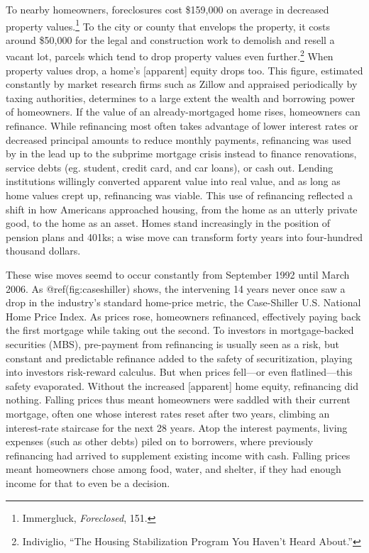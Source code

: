 \documentclass[
]{article}
\let\rmarkdownfootnote\footnote%
\def\footnote{\protect\rmarkdownfootnote}
\begin{document}
To nearby homeowners, foreclosures cost \$159,000 on average in
decreased property values.\footnote{Immergluck, \emph{Foreclosed}, 151.}
To the city or county that envelops the property, it costs around
\$50,000 for the legal and construction work to demolish and resell a
vacant lot, parcels which tend to drop property values even
further.\footnote{Indiviglio, ``The Housing Stabilization Program You
  Haven't Heard About.''} When property values drop, a home's
{[}apparent{]} equity drops too. This figure, estimated constantly by
market research firms such as Zillow and appraised periodically by
taxing authorities, determines to a large extent the wealth and
borrowing power of homeowners. If the value of an already-mortgaged home
rises, homeowners can refinance. While refinancing most often takes
advantage of lower interest rates or decreased principal amounts to
reduce monthly payments, refinancing was used by in the lead up to the
subprime mortgage crisis instead to finance renovations, service debts
(eg. student, credit card, and car loans), or cash out. Lending
institutions willingly converted apparent value into real value, and as
long as home values crept up, refinancing was viable. This use of
refinancing reflected a shift in how Americans approached housing, from
the home as an utterly private good, to the home as an asset. Homes
stand increasingly in the position of pension plans and 401ks; a wise
move can transform forty years into four-hundred thousand dollars.

These wise moves seemd to occur constantly from September 1992 until
March 2006. As @ref(fig:caseshiller) shows, the intervening 14 years
never once saw a drop in the industry's standard home-price metric, the
Case-Shiller U.S. National Home Price Index. As prices rose, homeowners
refinanced, effectively paying back the first mortgage while taking out
the second. To investors in mortgage-backed securities (MBS),
pre-payment from refinancing is usually seen as a risk, but constant and
predictable refinance added to the safety of securitization, playing
into investors risk-reward calculus. But when prices fell---or even
flatlined---this safety evaporated. Without the increased {[}apparent{]}
home equity, refinancing did nothing. Falling prices thus meant
homeowners were saddled with their current mortgage, often one whose
interest rates reset after two years, climbing an interest-rate
staircase for the next 28 years. Atop the interest payments, living
expenses (such as other debts) piled on to borrowers, where previously
refinancing had arrived to supplement existing income with cash. Falling
prices meant homeowners chose among food, water, and shelter, if they
had enough income for that to even be a decision.
\end{document}
